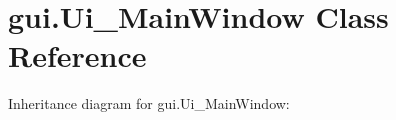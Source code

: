 \hypertarget{classgui_1_1Ui__MainWindow}{}\section{gui.\+Ui\+\_\+\+Main\+Window Class Reference}
\label{classgui_1_1Ui__MainWindow}


Inheritance diagram for gui.\+Ui\+\_\+\+Main\+Window\+:
